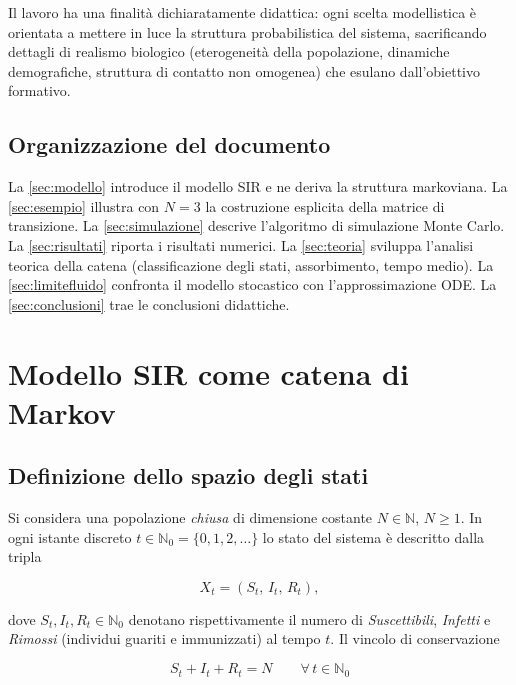 \documentclass[11pt, a4paper]{article}
\theoremstyle{plain}
\theoremstyle{definition}
\theoremstyle{remark}
\newcommand{\N}{\mathbb{N}}
\begin{document}
Il lavoro ha una finalità dichiaratamente didattica: ogni scelta modellistica è orientata a
mettere in luce la struttura probabilistica del sistema, sacrificando dettagli di realismo
biologico (eterogeneità della popolazione, dinamiche demografiche, struttura di contatto
non omogenea) che esulano dall'obiettivo formativo.

\subsection{Organizzazione del documento}

La \autoref{sec:modello} introduce il modello SIR e ne deriva la struttura markoviana.
La \autoref{sec:esempio} illustra con $N=3$ la costruzione esplicita della matrice di
transizione. La \autoref{sec:simulazione} descrive l'algoritmo di simulazione Monte Carlo.
La \autoref{sec:risultati} riporta i risultati numerici. La \autoref{sec:teoria} sviluppa
l'analisi teorica della catena (classificazione degli stati, assorbimento, tempo medio).
La \autoref{sec:limitefluido} confronta il modello stocastico con l'approssimazione ODE.
La \autoref{sec:conclusioni} trae le conclusioni didattiche.

\section{Modello SIR come catena di Markov}
\label{sec:modello}

\subsection{Definizione dello spazio degli stati}

Si considera una popolazione \emph{chiusa} di dimensione costante $N \in \N$, $N \geq 1$.
In ogni istante discreto $t \in \N_0 = \{0, 1, 2, \ldots\}$ lo stato del sistema è descritto
dalla tripla

\[
  X_t = (S_t,\, I_t,\, R_t),
\]

dove $S_t, I_t, R_t \in \N_0$ denotano rispettivamente il numero di
\emph{Suscettibili}, \emph{Infetti} e \emph{Rimossi} (individui guariti e
immunizzati) al tempo $t$. Il vincolo di conservazione

\begin{equation}\label{eq:conservazione}
  S_t + I_t + R_t = N \qquad \forall\, t \in \N_0
\end{equation}
\end{document}
